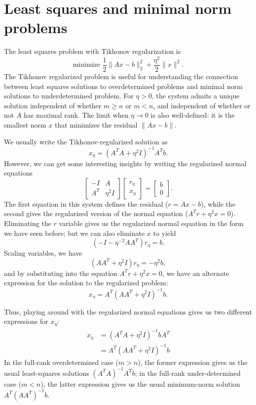 \documentclass[12pt, leqno]{article} %
\begin{document}


\section{Least squares and minimal norm problems}


The least squares problem with Tikhonov regularization is
\[
  \mbox{minimize } \frac{1}{2} \|Ax-b\|_2^2 + \frac{\eta^2}{2} \|x\|^2.
\]
The Tikhonov regularized problem is useful for understanding the
connection between least squares solutions to overdetermined problems
and minimal norm solutions to underdetermined problem.
For $\eta > 0$, the system admits a unique solution independent of whether $m
\geq n$ or $m < n$, and independent of whether or not $A$ has maximal
rank.  The limit when $\eta \rightarrow 0$ is also well-defined:
it is the smallest norm $x$ that minimizes the residual $\|Ax-b\|$.

We usually write the Tikhonov-regularized solution as
\[
  x_\eta = (A^T A + \eta^2 I)^{-1} A^T b.
\]
However, we can get some interesting insights by writing the
regularized normal equations
\[
  \begin{bmatrix} -I & A \\ A^T & \eta^2 I \end{bmatrix}
  \begin{bmatrix} r_\eta \\ x_\eta \end{bmatrix} =
  \begin{bmatrix} b \\ 0 \end{bmatrix}.
\]
The first equation in this system defines the residual ($r = Ax-b$),
while the second gives the regularized version of the normal equation
($A^T r + \eta^2 x = 0$).  Eliminating the $r$ variable gives us the
regularized normal equation in the form we have seen before; but we
can also eliminate $x$ to yield
\[
  (-I - \eta^{-2} A A^T) r_\eta = b.
\]
Scaling variables, we have
\[
  (AA^T + \eta^2 I) r_\eta = -\eta^2 b,
\]
and by substituting into the equation $A^T r + \eta^2 x = 0$, we have
an alternate expression for the solution to the regularized problem:
\[
  x_\eta = A^T (AA^T + \eta^2 I)^{-1} b.
\]

Thus, playing around with the regularized normal equations gives us
two different expressions for $x_\eta$:
\begin{align*}
  x_\eta &= (A^T A + \eta^2 I)^{-1} b A^T \\
        &= A^T (AA^T + \eta^2 I)^{-1} b
\end{align*}
In the full-rank overdetermined case ($m > n$), the former expression
gives us the usual least-squares solutions $(A^T A)^{-1} A^T b$;
in the full-rank under-determined case ($m < n$), the latter
expression gives us the usual minimum-norm solution $A^T (AA^T)^{-1} b$.
\end{document}
